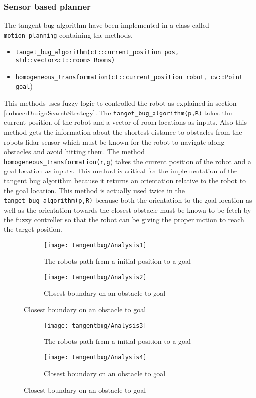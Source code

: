 \documentclass[../Head/Main.tex]{subfiles}
\begin{document}
\subsubsection{Sensor based planner}
\label{subsec:tangentBug}
The tangent bug algorithm have been implemented in a class called \texttt{motion\_planning} containing the methods.
\begin{itemize}
	\item \texttt{tanget\_bug\_algorithm(ct::current\_position pos, std::vector<ct::room> Rooms)}
	\item \texttt{homogeneous\_transformation(ct::current\_position robot, cv::Point goal})
\end{itemize}
This methods uses fuzzy logic to controlled the robot as explained in section \ref{subsec:DesignSearchStrategy}. The \texttt{tanget\_bug\_algorithm(p,R)} takes the current position of the robot and a vector of room locations as inputs. Also this method gets the information about the shortest distance to obstacles from the robots lidar sensor which must be known for the robot to navigate along obstacles and avoid hitting them. The method \texttt{homogeneous\_transformation(r,g}) takes the current position of the robot and a goal location as inputs. This method is critical for the implementation of the tangent bug algorithm because it returns an orientation relative to the robot to the goal location. This method is actually used twice in the \texttt{tanget\_bug\_algorithm(p,R)} because both the orientation to the goal location as well as the orientation towards the closest obstacle must be known to be fetch by the fuzzy controller so that the robot can be giving the proper motion to reach the target position. 

\begin{figure}[H]
  \begin{subfigure}[b]{0.59\textwidth}
    \centering
    \texttt{[image: tangentbug/Analysis1]}
    \caption{The robots path from a initial position to a goal}
    \label{fig:tangentBugRobotPath1}
  \end{subfigure}
  \hfill
   \begin{subfigure}[b]{0.39\textwidth}
    \centering
    \texttt{[image: tangentbug/Analysis2]}
    \caption{Closest boundary on an obstacle to goal}
    \label{fig:closestBoundaryOnObstacle1}
  \end{subfigure}
  \end{figure}
  
\begin{figure}[H]
  \begin{subfigure}[b]{0.59\textwidth}
    \centering
    \texttt{[image: tangentbug/Analysis3]}
    \caption{The robots path from a initial position to a goal}
    \label{fig:tangentBugRobotPath2}
  \end{subfigure}
  \hfill
   \begin{subfigure}[b]{0.39\textwidth}
    \centering
    \texttt{[image: tangentbug/Analysis4]}
    \caption{Closest boundary on an obstacle to goal}
    \label{fig:closestBoundaryOnObstacle2}
  \end{subfigure}
  \end{figure}
  
\end{document}
